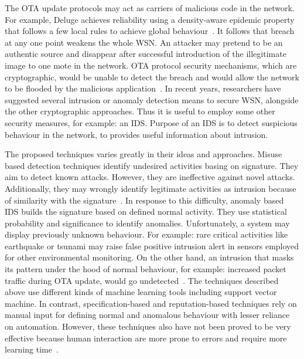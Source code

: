 \documentclass[conference,manuscript]{IEEEtran}
\begin{document}
The OTA update protocols may act as carriers of malicious
code in the network. For example, Deluge achieves reliability
using a density-aware epidemic property that 
follows a few local rules to achieve global
behaviour~\cite{1031506}.
It follows that breach at any one point weakens
the whole WSN. An attacker may pretend to be an authentic
source and disappear after successful introduction of the illegitimate image to one mote in the network. OTA protocol security
mechanisms, which are cryptographic, would be unable to
detect the breach and would allow the network to be flooded
by the malicious application~\cite{Karlof:2004:TLL:1031495.1031515}.
In recent years, researchers
have suggested several intrusion or anomaly detection means
to secure WSN, alongside the other cryptographic approaches.
Thus it is useful to employ some other security measures, for
example: an IDS. Purpose of an IDS is to detect suspicious
behaviour in the network, to provides useful information about
intrusion.

The proposed techniques varies greatly in their ideas and approaches.
Misuse based  detection  techniques identify undesired activities basing on signature.
They aim to detect known attacks.
However, they are ineffective against novel attacks.
Additionally, they may wrongly identify legitimate activities as intrusion because of similarity with the signature~\cite{372146, 1515559, ISI:000298891500099, Chen:2009:NMI:1516241.1516282, 1424814, Strikos_afull}.
In response to this difficulty, anomaly based IDS builds the signature based on defined normal activity.
They use statistical probability and significance to identify anomalies. Unfortunately, a system may display previously unknown behaviour.
For example: rare critical activities like earthquake or tsunami may raise false positive intrusion alert in sensors employed for other environmental monitoring.
On the other hand, an intrusion that masks its pattern under the hood of normal behaviour, for example: increased packet traffic during OTA update, would go undetected~\cite{ISI:000257882502160, 1593102, 1290173, 4024996}.
The techniques described above use different kinds of machine learning tools including support vector machine.
In contrast, specification-based and reputation-based techniques rely on manual input for defining normal and anomalous behaviour with lesser reliance on automation.
However, these techniques also have not been proved to be very effective because human interaction are more prone to errors and require more learning time~\cite{Chen:2009:NMI:1516241.1516282, 4085803, Ko2001}. 
\end{document}
